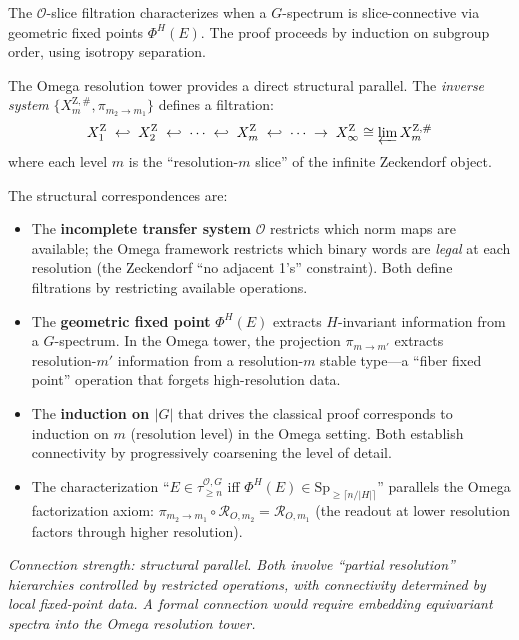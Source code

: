 \begin{remark}
The $\mathcal O$-slice filtration characterizes when a $G$-spectrum
is slice-connective via geometric fixed points $\Phi^H(E)$.
The proof proceeds by induction on subgroup order, using isotropy
separation.

The Omega resolution tower provides a direct structural parallel.
The \emph{inverse system}
$\{X_m^{\mathrm Z,\#},\pi_{m_2\to m_1}\}$ defines a filtration:
\[
X_1^{\mathrm Z}\;\hookleftarrow\;X_2^{\mathrm Z}\;\hookleftarrow\;\cdots
\;\hookleftarrow\;X_m^{\mathrm Z}
\;\hookleftarrow\;\cdots\;\to\;
X_\infty^{\mathrm Z}\cong\varprojlim X_m^{\mathrm Z,\#}
\]
where each level $m$ is the ``resolution-$m$ slice'' of the
infinite Zeckendorf object.

The structural correspondences are:
\begin{itemize}[nosep]
\item The \textbf{incomplete transfer system} $\mathcal O$ restricts
  which norm maps are available; the Omega framework restricts which
  binary words are \emph{legal} at each resolution (the Zeckendorf
  ``no adjacent 1's'' constraint).  Both define filtrations by
  restricting available operations.
\item The \textbf{geometric fixed point} $\Phi^H(E)$ extracts
  $H$-invariant information from a $G$-spectrum.  In the Omega
  tower, the projection $\pi_{m\to m'}$ extracts resolution-$m'$
  information from a resolution-$m$ stable type---a ``fiber fixed
  point'' operation that forgets high-resolution data.
\item The \textbf{induction on $|G|$} that drives the classical
  proof corresponds to induction on $m$ (resolution level) in the
  Omega setting.  Both establish connectivity
  by progressively coarsening the level of detail.
\item The characterization
  ``$E\in\tau^{\mathcal O,G}_{\ge n}$ iff
  $\Phi^H(E)\in\mathrm{Sp}_{\ge\lceil n/|H|\rceil}$''
  parallels the Omega factorization axiom:
  $\pi_{m_2\to m_1}\circ\mathcal R_{O,m_2}=\mathcal R_{O,m_1}$
  (the readout at lower resolution factors through higher resolution).
\end{itemize}

\emph{Connection strength: structural parallel.
Both involve ``partial resolution'' hierarchies controlled by
restricted operations, with connectivity determined by local
fixed-point data.  A formal connection would require embedding
equivariant spectra into the Omega resolution tower.}
\end{remark}


